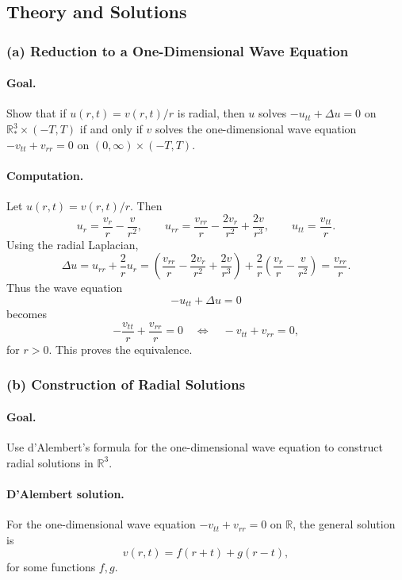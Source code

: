 \documentclass[12pt,a4paper]{article}
\theoremstyle{plain}
\theoremstyle{definition}
\theoremstyle{remark}
\theoremstyle{remark}
\begin{document}
\subsection*{Theory and Solutions}

\subsubsection*{(a) \; Reduction to a One-Dimensional Wave Equation}

\paragraph{\textbf{Goal.}}
Show that if $u(r,t) = v(r,t)/r$ is radial, then $u$ solves
$-u_{tt} + \Delta u = 0$ on $\mathbb{R}^3_*\times(-T,T)$ if and only if
$v$ solves the one-dimensional wave equation
$-v_{tt}+v_{rr}=0$ on $(0,\infty)\times(-T,T)$.

\paragraph{\textbf{Computation.}}
Let $u(r,t) = v(r,t)/r$. Then
\[
u_r = \frac{v_r}{r} - \frac{v}{r^2},
\qquad
u_{rr}
= \frac{v_{rr}}{r} - \frac{2v_r}{r^2} + \frac{2v}{r^3},
\qquad
u_{tt} = \frac{v_{tt}}{r}.
\]
Using the radial Laplacian,
\[
\Delta u
= u_{rr} + \frac{2}{r}u_r
= \left(\frac{v_{rr}}{r} - \frac{2v_r}{r^2} + \frac{2v}{r^3}\right)
+ \frac{2}{r}\left(\frac{v_r}{r} - \frac{v}{r^2}\right)
= \frac{v_{rr}}{r}.
\]
Thus the wave equation
\[
-u_{tt} + \Delta u = 0
\]
becomes
\[
-\frac{v_{tt}}{r} + \frac{v_{rr}}{r} = 0
\quad\Longleftrightarrow\quad
-v_{tt} + v_{rr} = 0,
\]
for $r>0$. This proves the equivalence.

\subsubsection*{(b) \; Construction of Radial Solutions}

\paragraph{\textbf{Goal.}}
Use d'Alembert's formula for the one-dimensional wave equation to
construct radial solutions in $\mathbb{R}^3$.

\paragraph{\textbf{D'Alembert solution.}}
For the one-dimensional wave equation $-v_{tt}+v_{rr}=0$ on $\mathbb{R}$,
the general solution is
\[
v(r,t) = f(r+t) + g(r-t),
\]
for some functions $f,g$.
\end{document}
